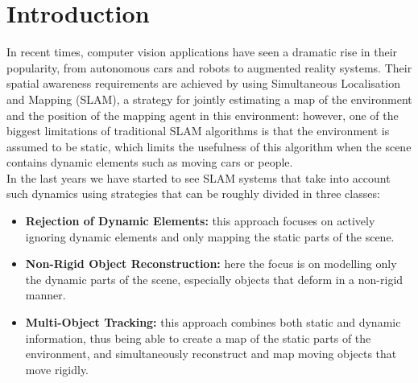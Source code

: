 \documentclass[12pt,twoside]{report}
\date{June 2019}
\begin{document}



\clearpage{\pagestyle{empty}\cleardoublepage}
\setcounter{page}{1}
\pagestyle{fancy}


\cleardoublepage

\clearpage{\pagestyle{empty}\cleardoublepage}

\tableofcontents 


\clearpage{\pagestyle{empty}\cleardoublepage}
\setcounter{page}{1}
\fancyhead[LE,RO]{\slshape \rightmark}
\fancyhead[LO,RE]{\slshape \leftmark}

\chapter{Introduction}

In recent times, computer vision applications have seen a dramatic rise in their popularity, from autonomous cars and robots to augmented reality systems. Their spatial awareness requirements are achieved by using Simultaneous Localisation and Mapping (SLAM), a strategy for jointly estimating a map of the environment and the position of the mapping agent in this environment: however, one of the biggest limitations of traditional SLAM algorithms is that the environment is assumed to be static, which limits the usefulness of this algorithm when the scene contains dynamic elements such as moving cars or people.
\\

In the last years we have started to see SLAM systems that take into account such dynamics using strategies that can be roughly divided in three classes:

\begin{itemize}
\item \textbf{Rejection of Dynamic Elements:} this approach focuses on actively ignoring dynamic elements and only mapping the static parts of the scene.
\item \textbf{Non-Rigid Object Reconstruction:} here the focus is on modelling only the dynamic parts of the scene, especially objects that deform in a non-rigid manner.
\item \textbf{Multi-Object Tracking:} this approach combines both static and dynamic information, thus being able to create a map of the static parts of the environment, and simultaneously reconstruct and map moving objects that move rigidly.
\end{itemize}
\end{document}
